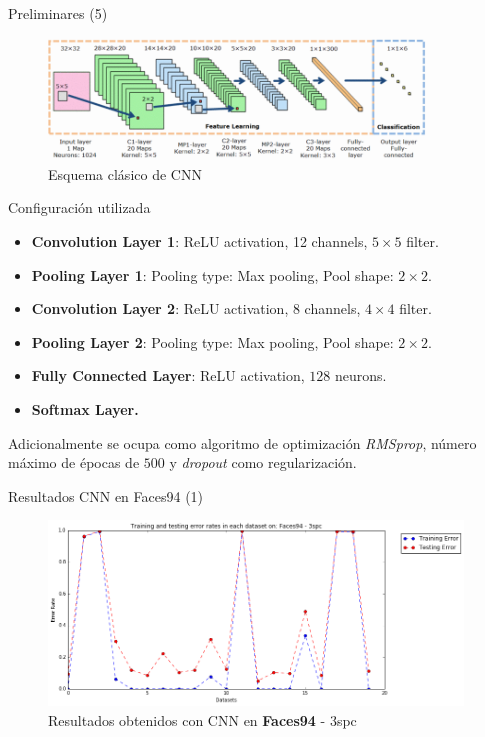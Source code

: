 \documentclass{beamer}
\begin{document}
\begin{frame}{Preliminares (5)}
\begin{figure}[htpb!]
\centering
\includegraphics[width=10cm]{convolution_3}
\caption{Esquema clásico de CNN}
\end{figure}
\end{frame}


\begin{frame}{Configuración utilizada}
\begin{itemize}
\item \textbf{Convolution Layer 1}: ReLU activation, 12 channels, $5\times 5$ filter.
\item \textbf{Pooling Layer 1}: Pooling type: Max pooling, Pool shape: $2 \times 2$.
\item \textbf{Convolution Layer 2}: ReLU activation, 8 channels, $4\times 4$ filter.
\item \textbf{Pooling Layer 2}: Pooling type: Max pooling, Pool shape: $2 \times 2$.
\item \textbf{Fully Connected Layer}: ReLU activation, $128$ neurons.
\item \textbf{Softmax Layer.}
\end{itemize}

Adicionalmente se ocupa como algoritmo de optimización \textit{RMSprop}, número máximo de épocas de $500$ y
\textit{dropout} como regularización.
\end{frame}


\begin{frame}{Resultados CNN en Faces94 (1)}
\begin{figure}[htpb!]
\centering
\includegraphics[width=11cm]{convolution_4}
\caption{Resultados obtenidos con CNN en \textbf{Faces94} - 3spc}
\end{figure}
\end{frame}
\end{document}

